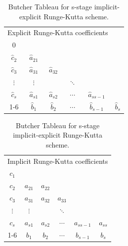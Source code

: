 \begin{table}[H]
    \centering
    \begin{tabular}{c|ccccc}
        \multicolumn{5}{c}{Explicit Runge-Kutta coefficients}                                     \\[0.5ex]
        $0$         &                &                &          &                                \\
        $\hat{c}_2$ & $\hat{a}_{21}$ &                &          &                                \\
        $\hat{c}_3$ & $\hat{a}_{31}$ & $\hat{a}_{32}$ &          &                                \\
        $\vdots$    & $\vdots$       &                & $\ddots$ &                                \\
        $\hat{c}_s$ & $\hat{a}_{s1}$ & $\hat{a}_{s2}$ & $\cdots$ & $\hat{a}_{ss-1}$               \\
        \cline{1-6}
                    & $\hat{b}_1$    & $\hat{b}_2$    & $\cdots$ & $\hat{b}_{s-1}$  & $\hat{b}_s$
    \end{tabular}
    \hspace{5em}
    \begin{tabular}{c|ccccc}
        \multicolumn{6}{c}{Implicit Runge-Kutta coefficients}             \\[0.5ex]
        $c_1$    &          &          &          &            &          \\
        $c_2$    & $a_{21}$ & $a_{22}$ &          &            &          \\
        $c_3$    & $a_{31}$ & $a_{32}$ & $a_{33}$ &            &          \\
        $\vdots$ & $\vdots$ &          & $\ddots$ &            &          \\
        $c_s$    & $a_{s1}$ & $a_{s2}$ & $\cdots$ & $a_{ss-1}$ & $a_{ss}$ \\
        \cline{1-6}
                 & $b_1$    & $b_2$    & $\cdots$ & $b_{s-1}$  & $b_s$
    \end{tabular}
    \caption{Butcher Tableau for s-stage implicit-explicit Runge-Kutta scheme.\cite{Ascher_1997}}
    \label{tab:butcher}
\end{table}

